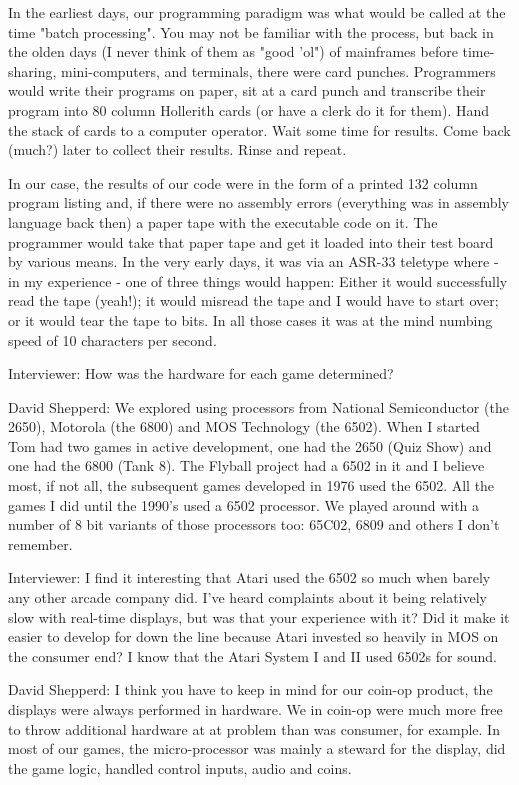 In the earliest days, our programming paradigm was what would be called at the time "batch processing". You may not be familiar with the process, but back in the olden days (I never think of them as "good 'ol") of mainframes before time-sharing, mini-computers, and terminals, there were card punches. Programmers would write their programs on paper, sit at a card punch and transcribe their program into 80 column Hollerith cards (or have a clerk do it for them). Hand the stack of cards to a computer operator. Wait some time for results. Come back (much?) later to collect their results. Rinse and repeat. 

In our case, the results of our code were in the form of a printed 132 column program listing and, if there were no assembly errors (everything was in assembly language back then) a paper tape with the executable code on it. The programmer would take that paper tape and get it loaded into their test board by various means. In the very early days, it was via an ASR-33 teletype where - in my experience - one of three things would happen: Either it would successfully read the tape (yeah!); it would misread the tape and I would have to start over; or it would tear the tape to bits. In all those cases it was at the mind numbing speed of 10 characters per second.

\textcolor{interviewer}{Interviewer:} How was the hardware for each game determined?

\textcolor{interviewee}{David Shepperd:} We explored using processors from National Semiconductor (the 2650), Motorola (the 6800) and MOS Technology (the 6502). When I started Tom had two games in active development, one had the 2650 (Quiz Show) and one had the 6800 (Tank 8). The Flyball project had a 6502 in it and I believe most, if not all, the subsequent games developed in 1976 used the 6502. All the games I did until the 1990's used a 6502 processor. We played around with a number of 8 bit variants of those processors too: 65C02, 6809 and others I don't remember. 

\textcolor{interviewer}{Interviewer:} I find it interesting that Atari used the 6502 so much when barely any other arcade company did. I've heard complaints about it being relatively slow with real-time displays, but was that your experience with it? Did it make it easier to develop for down the line because Atari invested so heavily in MOS on the consumer end? I know that the Atari System I and II used 6502s for sound.

\textcolor{interviewee}{David Shepperd:} I think you have to keep in mind for our coin-op product, the displays were always performed in hardware. We in coin-op were much more free to throw additional hardware at at problem than was consumer, for example. In most of our games, the micro-processor was mainly a steward for the display, did the game logic, handled control inputs, audio and coins. 

